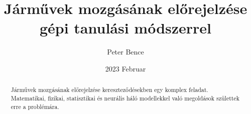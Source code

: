 \documentclass{article}
\title{Járművek mozgásának előrejelzése gépi tanulási módszerrel}
\author{Peter Bence}
\date{2023 Februar}
\begin{document}
    \maketitle
    \begin{abstract}
        Járművek mozgásának előrejelzése kereszteződésekben egy komplex feladat. Matematikai, fizikai, statisztikai és neurális háló modellekkel való megoldások születtek erre a problémára.
    \end{abstract}
\end{document}
